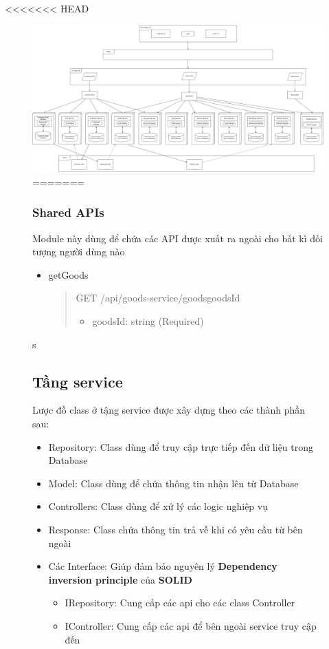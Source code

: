 <<<<<<< HEAD
\begin{figure}[!htp]
	\centering
	\includegraphics[width=6in]{img/Architecture/general-architect.png}
=======

\subsubsection{Shared APIs}
Module này dùng để chứa các API được xuất ra ngoài cho bất kì đối tượng người dùng nào

\begin{itemize}
	\item getGoods
	\begin{quote}
		GET /api/goods-service/goods{goodsId}
		\begin{itemize}
			\item goodsId: string (Required)
		\end{itemize}
	\end{quote}
\end{itemize}

s



\subsection{Tầng service}

Lược đồ class ở tậng service được xây dựng theo các thành phần sau:
\begin{itemize}
	\item Repository: Class dùng để truy cập trực tiếp đến dữ liệu trong Database
	\item Model: Class dùng để chứa thông tin nhận lên từ Database
	\item Controllers: Class dùng để xử lý các logic nghiệp vụ
	\item Response: Class chứa thông tin trả về khi có yêu cầu từ bên ngoài
	\item Các Interface: Giúp đảm bảo nguyên lý \textbf{Dependency inversion principle} của \textbf{SOLID}
	      \begin {itemize}
	\item IRepository: Cung cấp các api cho các class Controller
	\item IController: Cung cấp các api để bên ngoài service truy cập đến
\end{itemize}
\end{itemize}




\end{figure}
